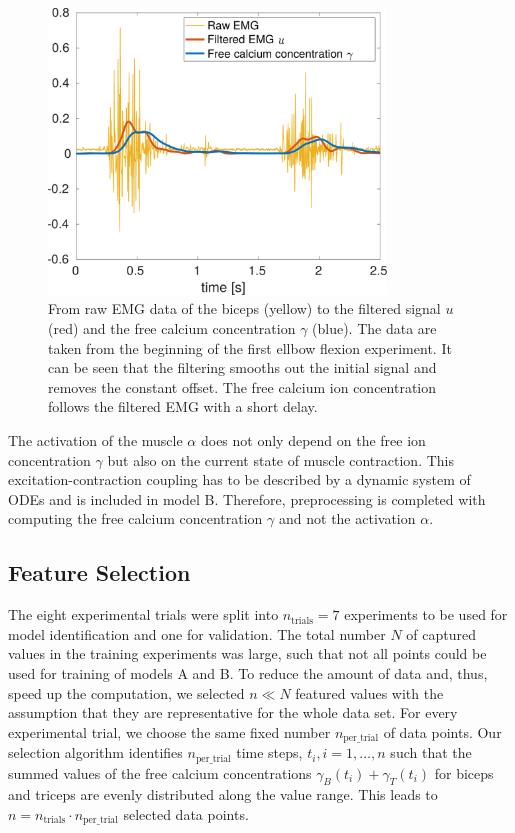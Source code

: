 \begin{figure}%
  \centering%
  \includegraphics[width=0.8\textwidth]{images/summer_school_study/emg_filtering.pdf}%
  \caption{From raw EMG data of the biceps (yellow) to the filtered signal $u$ (red) and the free calcium concentration $\gamma$ (blue). The data are taken from the beginning of the first ellbow flexion experiment. It can be seen that the filtering smooths out the initial signal and removes the constant offset. The free calcium ion concentration follows the filtered EMG with a short delay.}%
  \label{fig:emg_filtering}%
\end{figure}%

The activation of the muscle $\alpha$ does not only depend on the free ion concentration $\gamma$ but also on the current state of muscle contraction. This excitation-contraction coupling has to be described by a dynamic system of ODEs and is included in model B.
Therefore, preprocessing is completed with computing the free calcium concentration $\gamma$ and not the activation $\alpha$.

\subsection{Feature Selection} \label{sec:study_feature_selection}

The eight experimental trials were split into $n_\text{trials}=7$ experiments to be used for model identification and one for validation.
The total number $N$ of captured values in the training experiments was large, such that not all points could be used for training of models A and B.
To reduce the amount of data and, thus, speed up the computation, we selected $n \ll N$ featured values with the assumption that they are representative for the whole data set.
For every experimental trial, we choose the same fixed number $n_\text{per\_trial}$ of data points.
Our selection algorithm identifies $n_\text{per\_trial}$ time steps, $t_i, i=1, \dots, n$ such that the summed values of the free calcium concentrations $\gamma_B(t_i) + \gamma_T(t_i)$ for biceps and triceps are evenly distributed along the value range.
This leads to $n = n_\text{trials} \cdot n_\text{per\_trial}$ selected data points.

